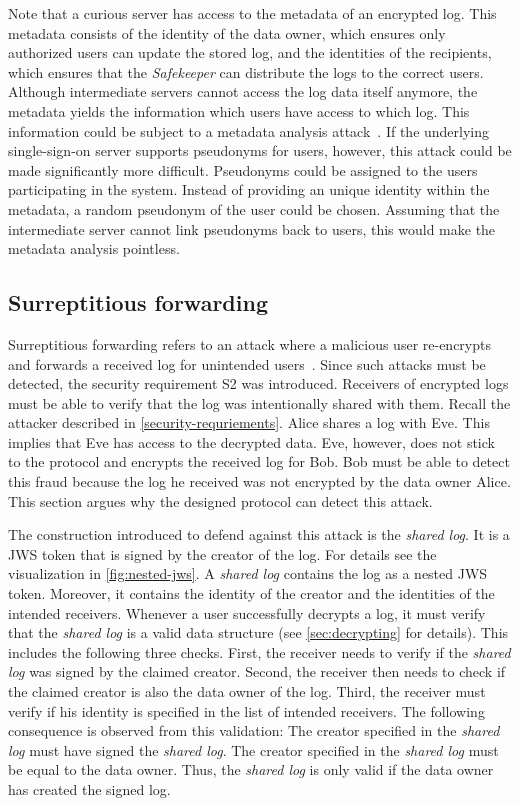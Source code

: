 \documentclass[../main.tex]{subfiles}
\begin{document}
Note that a curious server has access to the metadata of an encrypted log.
This metadata consists of the identity of the data owner, which ensures only authorized users can update the stored log, and the identities of the recipients, which ensures that the \emph{Safekeeper} can distribute the logs to the correct users.
Although intermediate servers cannot access the log data itself anymore, the metadata yields the information which users have access to which log.
This information could be subject to a metadata analysis attack~\cite{Greschbach2012,Mayer2016}.
If the underlying single-sign-on server supports pseudonyms for users, however, this attack could be made significantly more difficult.
Pseudonyms could be assigned to the users participating in the system.
Instead of providing an unique identity within the metadata, a random pseudonym of the user could be chosen.
Assuming that the intermediate server cannot link pseudonyms back to users, this would make the metadata analysis pointless.

\subsection{Surreptitious forwarding}
Surreptitious forwarding refers to an attack where a malicious user re-encrypts and forwards a received log for unintended users~\cite{Davis2001}.
Since such attacks must be detected, the security requirement S2 was introduced.
Receivers of encrypted logs must be able to verify that the log was intentionally shared with them.
Recall the attacker described in \cref{security-requriements}.
Alice shares a log with Eve.
This implies that Eve has access to the decrypted data.
Eve, however, does not stick to the protocol and encrypts the received log for Bob.
Bob must be able to detect this fraud because the log he received was not encrypted by the data owner Alice.
This section argues why the designed protocol can detect this attack.

The construction introduced to defend against this attack is the \emph{shared log}.
It is a JWS token that is signed by the creator of the log.
For details see the visualization in \cref{fig:nested-jws}.
A \emph{shared log} contains the log as a nested JWS token.
Moreover, it contains the identity of the creator and the identities of the intended receivers.
Whenever a user successfully decrypts a log, it must verify that the \emph{shared log} is a valid data structure (see \cref{sec:decrypting} for details).
This includes the following three checks.
First, the receiver needs to verify if the \emph{shared log} was signed by the claimed creator.
Second, the receiver then needs to check if the claimed creator is also the data owner of the log. 
Third, the receiver must verify if his identity is specified in the list of intended receivers.
The following consequence is observed from this validation:
The creator specified in the \emph{shared log} must have signed the \emph{shared log}.
The creator specified in the \emph{shared log} must be equal to the data owner.
Thus, the \emph{shared log} is only valid if the data owner has created the signed log.
\end{document}
